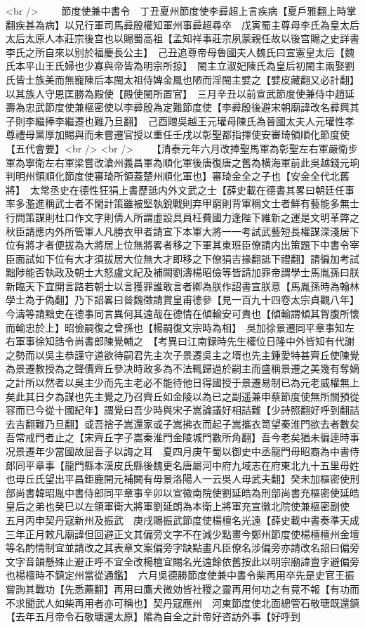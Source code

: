 <br />
　　節度使兼中書令　丁丑夏州節度使李彛超上言疾病【夏戶雅翻上時掌翻疾甚為病】以兄行軍司馬彛殷權知軍州事彛超尋卒　戊寅蜀主尊母李氏為皇太后太后太原人本莊宗後宫也以賜蜀高祖【孟知祥事莊宗夙蒙親任故以後宫賜之史詳書李氏之所自來以别於福慶長公主】　己丑追尊帝母魯國夫人魏氏曰宣憲皇太后【魏氏本平山王氏婦也少寡與帝皆為明宗所掠】　閩主立淑妃陳氏為皇后初閩主兩娶劉氏皆士族美而無寵陳后本閩太祖侍婢金鳳也陋而淫閩主嬖之【嬖皮藏翻又必計翻】以其族人守恩匡勝為殿使【殿使閩所置官】　三月辛丑以前宣武節度使兼侍中趙延壽為忠武節度使兼樞密使以李彛殷為定難節度使【李彛殷後避宋朝廟諱改名彛興其子則李繼捧李繼遷也難乃旦翻】　己酉贈吳越王元瓘母陳氏為晉國太夫人元瓘性孝尊禮母黨厚加賜與而未嘗遷官授以重任壬戌以彰聖都指揮使安審琦領順化節度使【五代會要】<br />
<br />
　　【清泰元年六月改捧聖馬軍為彰聖左右軍嚴衛步軍為寧衛左右軍梁嘗改滄州義昌軍為順化軍後唐復唐之舊為横海軍前此吳越錢元珦判明州領順化節度使審琦所領蓋楚州順化軍也】審琦金全之子也【安金全代北舊將】　太常丞史在德性狂狷上書歷詆内外文武之士【薛史載在德書其畧曰朝廷任事率多濫進稱武士者不閑計策雖被堅執銳戰則弃甲窮則背軍稱文士者鮮有藝能多無士行問策謀則杜口作文字則倩人所謂虛設具員枉費國力逢陛下維新之運是文明革弊之秋臣請應内外所管軍人凡勝衣甲者請宣下本軍大將一一考試武藝短長權謀深淺居下位有將才者便拔為大將居上位無將畧者移之下軍其東班臣僚請内出策題下中書令宰臣面試如下位有大才須拔居大位無大才即移之下僚狷吉掾翻詆下禮翻】請徧加考試黜陟能否執政及朝士大怒盧文紀及補闕劉濤楊昭儉等皆請加罪帝謂學士馬胤孫曰朕新臨天下宜開言路若朝士以言獲罪誰敢言者卿為朕作詔書宣朕意【馬胤孫時為翰林學士為于偽翻】乃下詔畧曰㫺魏徵請賞皇甫德參【見一百九十四卷太宗貞觀八年】今濤等請黜史在德事同言異何其遠哉在德情在傾輸安可責也【傾輸謂傾其胷腹所懷而輸忠於上】昭儉嗣復之曾孫也【楊嗣復文宗時為相】　吳加徐景遷同平章事知左右軍事徐知誥令尚書郎陳覺輔之　【考異曰江南録時先生權位日隆中外皆知有代謝之勢而以吳主恭謹守道欲待嗣君先主次子景遷吳主之壻也先主鍾愛特甚齊丘使陳覺為景遷教授為之聲價齊丘參决時政多為不法輒歸過於嗣主而盛稱景遷之美幾有奪嫡之計所以然者以吳主少而先主老必不能待他日得國授于景遷易制已為元老威權無上矣此其日夕為謀也先主覺之乃召齊丘如金陵以為已之副遥兼申蔡節度使無所關預從容而已今從十國紀年】謂覺曰吾少時與宋子嵩論議好相詰難【少詩照翻好呼到翻詰去吉翻難乃旦翻】或吾捨子嵩還家或子嵩拂衣而起子嵩攜衣笥望秦淮門欲去者數矣吾常戒門者止之【宋齊丘字子嵩秦淮門金陵城門數所角翻】吾今老矣猶未徧逹時事况景遷年少當國故屈吾子以誨之耳　夏四月庚午蜀以御史中丞龍門毋昭裔為中書侍郎同平章事【龍門縣本漢皮氏縣後魏更名唐屬河中府九域志在府東北九十五里毋姓也毋丘氏望出平昌鉅鹿開元補闕有毋景洛陽人一云吳人毋武夫翻】癸未加樞密使刑部尚書韓昭胤中書侍郎同平章事辛卯以宣徽南院使劉延皓為刑部尚書充樞密使延皓皇后之弟也癸巳以左領軍衛大將軍劉延朗為本衛上將軍充宣徽北院使兼樞密副使　五月丙申契丹寇新州及振武　庚戌賜振武節度使楊檀名光遠【薛史載中書奏準天成三年正月敕凡廟諱但回避正文其偏旁文字不在減少點畫今鄭州節度使楊檀檀州金壇等名酌情制宜並請改之其表章文案偏旁字缺點畫凡臣僚名涉偏旁亦請改名詔曰偏旁文字音韻懸殊止避正呼不宜全改楊檀宜賜名光遠餘依舊按此以明宗廟諱亶字避偏旁也楊檀時不鎮定州當從通鑑】　六月吳德勝節度使兼中書令柴再用卒先是史官王振嘗詢其戰功【先悉薦翻】再用曰鷹犬微効皆社稷之靈再用何功之有竟不報【有功而不求聞武人如柴再用者亦可稱也】契丹寇應州　河東節度使北面總管石敬瑭既還鎮【去年五月帝令石敬瑭還太原】隂為自全之計帝好咨訪外事【好呼到